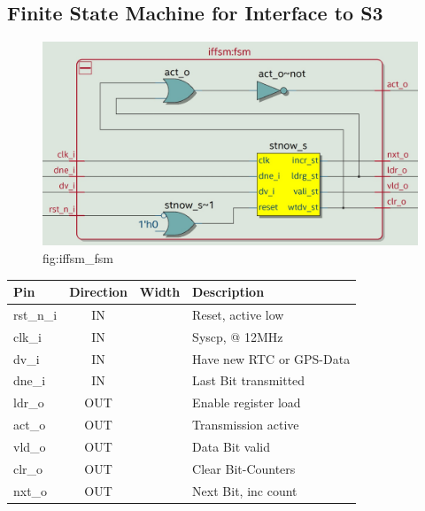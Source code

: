 \documentclass[12pt,a4 paper] {report}
\begin{document}
\subsection{Finite State Machine for Interface to S3}
\begin{figure}[h]
	\centering	
	\includegraphics[scale=0.2]{../png/iffsm_fsm.png}
	\newline
	fig:iffsm\_fsm\\
\end{figure}
\begin{center}
	\begin{tabular}{ | p{2cm} | c | c | p{5cm} |}
		\hline
		\textbf{Pin} & \textbf{Direction} & \textbf{Width} & \textbf{Description} \\
		\hline
		rst\_n\_i & IN &  & Reset, active low \\
		\hline
		clk\_i & IN &  & Syscp, @ 12MHz \\
		\hline
		dv\_i & IN &  & Have new RTC or GPS-Data \\
		\hline
		dne\_i & IN &  & Last Bit transmitted \\
		\hline
		ldr\_o & OUT &  & Enable register load \\
		\hline
		act\_o & OUT &  & Transmission active \\
		\hline
		vld\_o & OUT &  & Data Bit valid \\
		\hline
		clr\_o & OUT &  & Clear Bit-Counters \\
		\hline
		nxt\_o & OUT &  & Next Bit, inc count \\
		\hline
		
	\end{tabular}
	\end{center}
\end{document}
